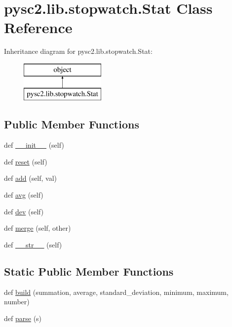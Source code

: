 \hypertarget{classpysc2_1_1lib_1_1stopwatch_1_1_stat}{}\section{pysc2.\+lib.\+stopwatch.\+Stat Class Reference}
\label{classpysc2_1_1lib_1_1stopwatch_1_1_stat}
Inheritance diagram for pysc2.\+lib.\+stopwatch.\+Stat\+:\begin{figure}[H]
\begin{center}
\leavevmode
\includegraphics[height=2.000000cm]{classpysc2_1_1lib_1_1stopwatch_1_1_stat}
\end{center}
\end{figure}
\subsection*{Public Member Functions}
\begin{DoxyCompactItemize}
\item 
def \mbox{\hyperlink{classpysc2_1_1lib_1_1stopwatch_1_1_stat_a3ad7dce5fecb54fa4a9021c35e51989d}{\+\_\+\+\_\+init\+\_\+\+\_\+}} (self)
\item 
def \mbox{\hyperlink{classpysc2_1_1lib_1_1stopwatch_1_1_stat_ad118826fca82844997e9f7b975c60687}{reset}} (self)
\item 
def \mbox{\hyperlink{classpysc2_1_1lib_1_1stopwatch_1_1_stat_acb6464e0344dd3c3dfd65d5db93ab44b}{add}} (self, val)
\item 
def \mbox{\hyperlink{classpysc2_1_1lib_1_1stopwatch_1_1_stat_aefeaafa88878c84bd17b85a3841f0202}{avg}} (self)
\item 
def \mbox{\hyperlink{classpysc2_1_1lib_1_1stopwatch_1_1_stat_a69773dec32c2376017dedbdc9a019d86}{dev}} (self)
\item 
def \mbox{\hyperlink{classpysc2_1_1lib_1_1stopwatch_1_1_stat_ab0ec24646c9d8fe5ceaa814a6bccf9b2}{merge}} (self, other)
\item 
def \mbox{\hyperlink{classpysc2_1_1lib_1_1stopwatch_1_1_stat_a65849f4bc2bd6fd067f17b1efb4ddf60}{\+\_\+\+\_\+str\+\_\+\+\_\+}} (self)
\end{DoxyCompactItemize}
\subsection*{Static Public Member Functions}
\begin{DoxyCompactItemize}
\item 
def \mbox{\hyperlink{classpysc2_1_1lib_1_1stopwatch_1_1_stat_a53c27533034e381b51873eb04d3a93b1}{build}} (summation, average, standard\+\_\+deviation, minimum, maximum, number)
\item 
def \mbox{\hyperlink{classpysc2_1_1lib_1_1stopwatch_1_1_stat_a193898b3e0c4b737cdfd42c9840d09ad}{parse}} (s)
\end{DoxyCompactItemize}
